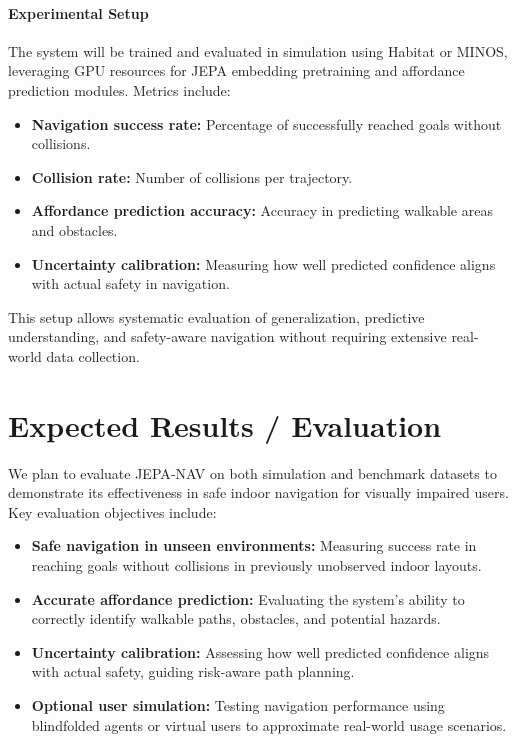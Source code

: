 \documentclass{article}
\begin{document}
\paragraph{Experimental Setup}  
The system will be trained and evaluated in simulation using Habitat or MINOS, leveraging GPU resources for JEPA embedding pretraining and affordance prediction modules. Metrics include:
\begin{itemize}
    \item \textbf{Navigation success rate:} Percentage of successfully reached goals without collisions.  
    \item \textbf{Collision rate:} Number of collisions per trajectory.  
    \item \textbf{Affordance prediction accuracy:} Accuracy in predicting walkable areas and obstacles.  
    \item \textbf{Uncertainty calibration:} Measuring how well predicted confidence aligns with actual safety in navigation.  
\end{itemize}

This setup allows systematic evaluation of generalization, predictive understanding, and safety-aware navigation without requiring extensive real-world data collection.

\section{Expected Results / Evaluation}

We plan to evaluate JEPA‑NAV on both simulation and benchmark datasets to demonstrate its effectiveness in safe indoor navigation for visually impaired users. Key evaluation objectives include:

\begin{itemize}
    \item \textbf{Safe navigation in unseen environments:} Measuring success rate in reaching goals without collisions in previously unobserved indoor layouts.
    \item \textbf{Accurate affordance prediction:} Evaluating the system's ability to correctly identify walkable paths, obstacles, and potential hazards.
    \item \textbf{Uncertainty calibration:} Assessing how well predicted confidence aligns with actual safety, guiding risk-aware path planning.
    \item \textbf{Optional user simulation:} Testing navigation performance using blindfolded agents or virtual users to approximate real-world usage scenarios.
\end{itemize}
\end{document}
